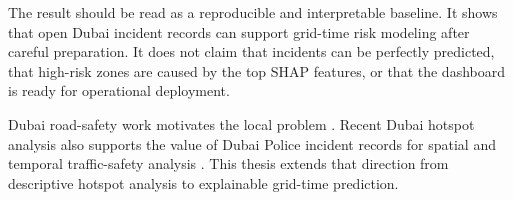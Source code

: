 The result should be read as a reproducible and interpretable baseline. It shows that open Dubai incident records can support grid-time risk modeling after careful preparation. It does not claim that incidents can be perfectly predicted, that high-risk zones are caused by the top SHAP features, or that the dashboard is ready for operational deployment.

Dubai road-safety work motivates the local problem \cite{aldah2010dubai,abdelfatah2015dubai}. Recent Dubai hotspot analysis also supports the value of Dubai Police incident records for spatial and temporal traffic-safety analysis \cite{alsaleh2026dubaihotspots}. This thesis extends that direction from descriptive hotspot analysis to explainable grid-time prediction.
